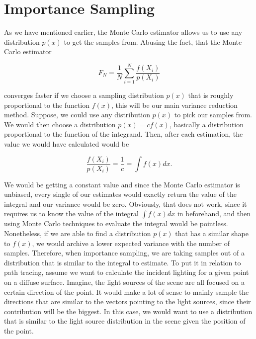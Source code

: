 \section{Importance Sampling}
\label{ch:preliminaries:is}

As we have mentioned earlier, the Monte Carlo estimator allows us to use any distribution $p(x)$ to get the samples from. Abusing the fact, that the Monte Carlo estimator 

\begin{equation}
F_N = \frac{1}{N}\sum_{i = 1}^{N}\frac{f(X_i)}{p(X_i)}
\end{equation}

converges faster if we choose a sampling distribution $p(x)$ that is roughly proportional to the function $f(x)$, this will be our main variance reduction method. Suppose, we could use any distribution $p(x)$ to pick our samples from. We would then choose a distribution $p(x) = cf(x)$, basically a distribution proportional to the function of the integrand. Then, after each estimation, the value we would have calculated would be 

\begin{equation}
\frac{f(X_i)}{p(X_i)} = \frac{1}{c} = \int{f(x)dx}.
\end{equation}

We would be getting a constant value and since the Monte Carlo estimator is unbiased, every single of our estimates would exactly return the value of the integral and our variance would be zero. Obviously, that does not work, since it requires us to know the value of the integral $\int{f(x)dx}$ in beforehand, and then using Monte Carlo techniques to evaluate the integral would be pointless. Nonetheless, if we are able to find a distribution $p(x)$ that has a similar shape to $f(x)$, we would archive a lower expected variance with the number of samples. Therefore, when importance sampling, we are taking samples out of a distribution that is similar to the integral to estimate. To put it in relation to path tracing, assume we want to calculate the incident lighting for a given point on a diffuse surface. Imagine, the light sources of the scene are all focused on a certain direction of the point. It would make a lot of sense to mainly sample the directions that are similar to the vectors pointing to the light sources, since their contribution will be the biggest. In this case, we would want to use a distribution that is similar to the light source distribution in the scene given the position of the point.

